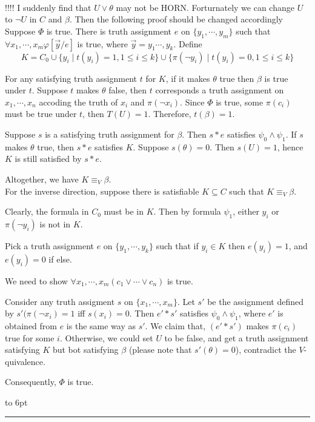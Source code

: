 \documentclass[12pt]{article}
\newenvironment{proof}{\parindent=0pt{\bf Proof: }}{
   \hspace*{\fill}\hbox to 6pt{\leaders\hrule width 6pt height 6pt\hfill}\par}
\begin{document}
\begin{proof}
\ \\

\color{red}
!!!! I suddenly find that $U\vee \theta $ may not be HORN. Forturnately we can change $U$ to $\neg U$ in $C$ and $\beta$. Then the following proof should be changed accordingly
\color{black}\\

Suppose $\Phi$ is true. There is truth assignment
$e$ on $\{y_1,\cdots, y_m\}$ such that $\forall x_1,\cdots,x_m\varphi[\vec{y}/e]$ is true, where $\vec{y}=y_1\cdots,y_k$. Define
%
$$K=C_0\cup \{y_i\mid t(y_i)=1, 1\leq i\leq k\}\cup \{\pi(\neg y_i)\mid t(y_i)=0, 1\leq i\leq k\}$$

For any satisfying truth assignment $t$ for $K$, if it makes $\theta$ true then $\beta$ is true under $t$. Suppose $t$ makes $\theta$ false, then $t$ corresponds a truth assignment on $x_1,\cdots, x_n$ accoding the truth of $x_i$ and $\pi(\neg x_i)$. Since $\Phi$ is true, some  $\pi(c_i)$ must be true under $t$, then $T(U)=1$. Therefore, $t(\beta)=1$.

Suppose $s$ is a satisfying truth assignment for $\beta$. Then $s*e$ satisfies $\psi_0\wedge \psi_1$. If $s$ makes $\theta$ true, then $s*e$ satisfies $K$. Suppose $s(\theta)=0$. Then $s(U)=1$, hence $K$ is still satisfied by $s*e$.

Altogether, we have $K\equiv_V\beta$.\\


For the inverse direction, suppose there is satisfiable $K\subseteq C$ such that $K\equiv_V\beta$.


Clearly, the formula in $C_0$ must be in $K$. Then by formula $\psi_1$, either $y_i$ or  $\pi(\neg y_i)$ is not in $K$.

Pick a truth assignment $e$ on $\{y_1,\cdots, y_k\}$ such that if $y_i\in K$ then $e(y_i)=1$, and $e(y_i)=0$  if else.

We need to show $\forall x_1,\cdots,x_m(c_1\vee\cdots\vee c_n)$ is true.

Consider any truth assigment $s$ on $\{x_1,\cdots, x_m\}$. Let $s'$ be the assignment defined by $s'(\pi(\neg x_i)=1$ iff $s(x_i)=0$. Then $e'*s'$ satisfies $\psi_0\wedge\psi_1$, where $e'$ is obtained from $e$ is the same way as $s'$.
We claim that, $(e'*s')$ makes $\pi(c_i)$ true for some $i$. Otherwise, we could set $U$ to be false,  and get a truth assignment satisfying $K$ but bot satisfying $\beta$ (please note that $s'(\theta)=0$), contradict the $V$-quivalence.

Consequently, $\Phi$ is true.
 \end{proof}
\end{document}
